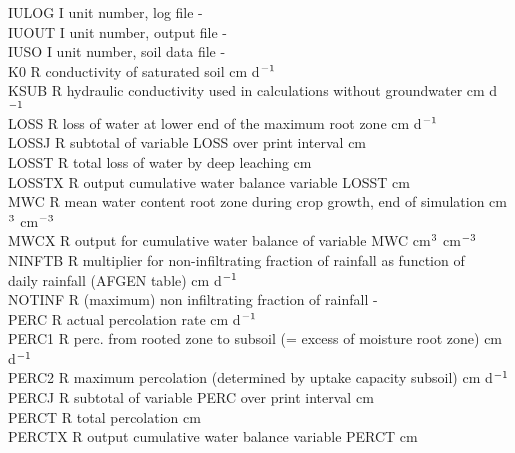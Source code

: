 \begin{tabbing}
IULOG\> \> I\> unit number, log file\> \> \> \> \> \> \> -\\
IUOUT\> \> I\> unit number, output file\> \> \> \> \> \> \> -\\
IUSO\> \> I\> unit number, soil data file \> \> \> \> \> \> \> -\\
K0\> \> R\> conductivity of saturated soil\> \> \> \> \> \> \> cm d$^{{\rm -1}}$\\
KSUB\> \> R\> hydraulic conductivity used in calculations without groundwater\> \> \> \> \> \> \> cm d$^{{\rm -1}}$\\
LOSS\> \> R\> loss of water at lower end of the maximum root zone\> \> \> \> \> \> \> cm d$^{{\rm -1}}$\\
LOSSJ\> \> R\> subtotal of variable LOSS over print interval\> \> \> \> \> \> \> cm\\
LOSST\> \> R\> total loss of water by deep leaching\> \> \> \> \> \> \> cm\\
LOSSTX\> \> R\> output cumulative water balance variable LOSST\> \> \> \> \> \> \> cm\\
MWC\> \> R\> mean water content root zone during crop growth, end of simulation\> \> \> \> \> \> \> cm$^{{\rm 3}}$ cm$^{{\rm -3}}$\\
MWCX\> \> R\> output for cumulative water balance of variable MWC\> \> \> \> \> \> \> cm$^{{\rm 3}}$ cm$^{{\rm -3}}$\\
NINFTB\> \> R\> multiplier for non-infiltrating fraction of rainfall as function of\\
\>\> \> daily rainfall (AFGEN table)\> \> \> \> \> \> \> cm d$^{{\rm -1}}$\\
NOTINF\> \> R\> (maximum) non infiltrating fraction of rainfall\> \> \> \> \> \> \> -\\
PERC\> \> R\> actual percolation rate\> \> \> \> \> \> \> cm d$^{{\rm -1}}$\\
PERC1\> \> R\> perc. from rooted zone to subsoil (= excess of moisture root zone)\> \> \> \> \> \> \> cm d$^{{\rm -1}}$\\
PERC2\> \> R\> maximum percolation (determined by uptake capacity subsoil)\> \> \> \> \> \> \> cm d$^{{\rm -1}}$\\
PERCJ\> \> R\> subtotal of variable PERC over print interval\> \> \> \> \> \> \> cm\\
PERCT\> \> R\> total percolation\> \> \> \> \> \> \> cm\\
PERCTX\> \> R\> output cumulative water balance variable PERCT\> \> \> \> \> \> \> cm\\

\end{tabbing}
